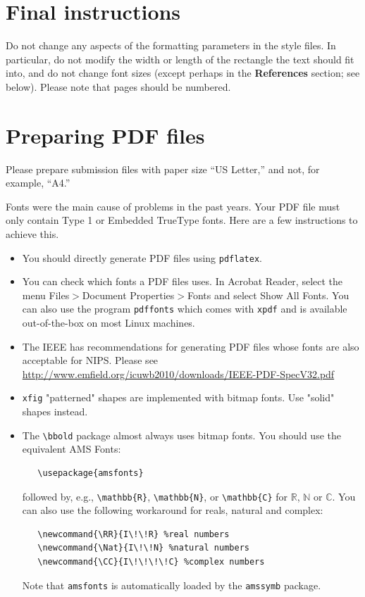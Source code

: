 \documentclass{article}
\begin{document}
\section{Final instructions}

Do not change any aspects of the formatting parameters in the style
files.  In particular, do not modify the width or length of the
rectangle the text should fit into, and do not change font sizes
(except perhaps in the \textbf{References} section; see below). Please
note that pages should be numbered.

\section{Preparing PDF files}

Please prepare submission files with paper size ``US Letter,'' and
not, for example, ``A4.''

Fonts were the main cause of problems in the past years. Your PDF file
must only contain Type 1 or Embedded TrueType fonts. Here are a few
instructions to achieve this.

\begin{itemize}

\item You should directly generate PDF files using \verb+pdflatex+.

\item You can check which fonts a PDF files uses.  In Acrobat Reader,
  select the menu Files$>$Document Properties$>$Fonts and select Show
  All Fonts. You can also use the program \verb+pdffonts+ which comes
  with \verb+xpdf+ and is available out-of-the-box on most Linux
  machines.

\item The IEEE has recommendations for generating PDF files whose
  fonts are also acceptable for NIPS. Please see
  \url{http://www.emfield.org/icuwb2010/downloads/IEEE-PDF-SpecV32.pdf}

\item \verb+xfig+ "patterned" shapes are implemented with bitmap
  fonts.  Use "solid" shapes instead.

\item The \verb+\bbold+ package almost always uses bitmap fonts.  You
  should use the equivalent AMS Fonts:
\begin{verbatim}
   \usepackage{amsfonts}
\end{verbatim}
followed by, e.g., \verb+\mathbb{R}+, \verb+\mathbb{N}+, or
\verb+\mathbb{C}+ for $\mathbb{R}$, $\mathbb{N}$ or $\mathbb{C}$.  You
can also use the following workaround for reals, natural and complex:
\begin{verbatim}
   \newcommand{\RR}{I\!\!R} %real numbers
   \newcommand{\Nat}{I\!\!N} %natural numbers
   \newcommand{\CC}{I\!\!\!\!C} %complex numbers
\end{verbatim}
Note that \verb+amsfonts+ is automatically loaded by the
\verb+amssymb+ package.

\end{itemize}
\end{document}
